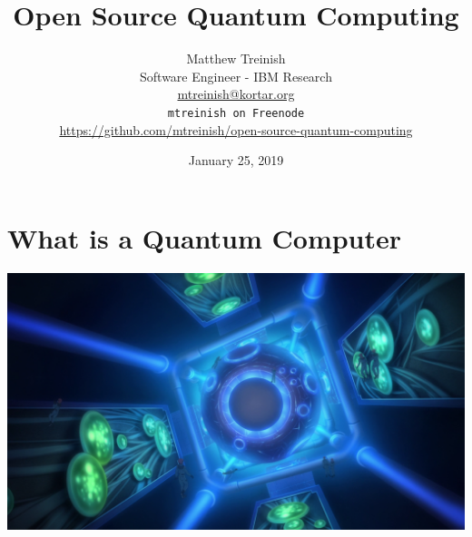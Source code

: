 \documentclass[aspectratio=169,11pt,hyperref={colorlinks=true}]{beamer}
\author[Matthew Treinish]{%
    \texorpdfstring{%
        \centering
        Matthew Treinish\\
        Software Engineer - IBM Research\\
        \href{mailto:mtreinish@kortar.org}{mtreinish@kortar.org}\\
        \texttt{mtreinish on Freenode}\\
        \href{https://github.com/mtreinish/open-source-quantum-computing}{https://github.com/mtreinish/open-source-quantum-computing}
   }
   {Matthew Treinish}
}
\date{January 25, 2019}
\title{Open Source Quantum Computing}
\begin{document}
\titlepage

\section{What is a Quantum Computer}
\begin{frame}
\end{frame}

\begin{frame}
    \includegraphics[width=\textwidth]{Veda_AD2314.png}
\end{frame}
\end{document}

